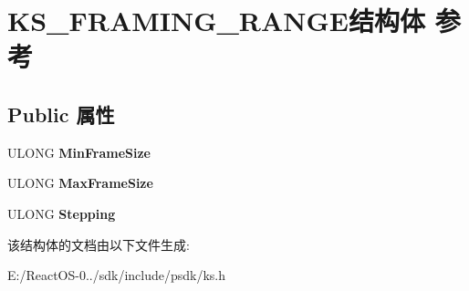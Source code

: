 \hypertarget{struct_k_s___f_r_a_m_i_n_g___r_a_n_g_e}{}\section{K\+S\+\_\+\+F\+R\+A\+M\+I\+N\+G\+\_\+\+R\+A\+N\+G\+E结构体 参考}
\label{struct_k_s___f_r_a_m_i_n_g___r_a_n_g_e}
\subsection*{Public 属性}
\begin{DoxyCompactItemize}
\item 
\mbox{\label{struct_k_s___f_r_a_m_i_n_g___r_a_n_g_e_ac7091ebd791a42498b4694e0dba4456f}} 
U\+L\+O\+NG {\bfseries Min\+Frame\+Size}
\item 
\mbox{\label{struct_k_s___f_r_a_m_i_n_g___r_a_n_g_e_a2c17c3b22db1cad07559eb69b489d569}} 
U\+L\+O\+NG {\bfseries Max\+Frame\+Size}
\item 
\mbox{\label{struct_k_s___f_r_a_m_i_n_g___r_a_n_g_e_a71fde719551b13f41fe6a6449866345d}} 
U\+L\+O\+NG {\bfseries Stepping}
\end{DoxyCompactItemize}


该结构体的文档由以下文件生成\+:\begin{DoxyCompactItemize}
\item 
E\+:/\+React\+O\+S-\/0../sdk/include/psdk/ks.\+h\end{DoxyCompactItemize}
